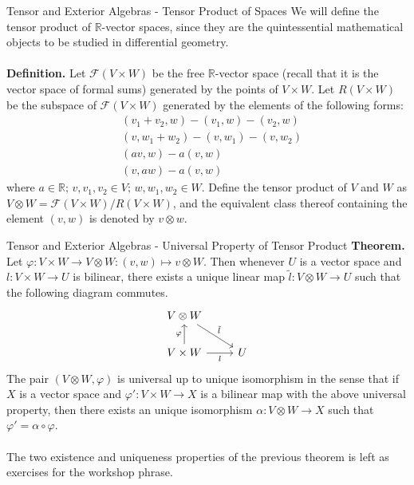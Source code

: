 \documentclass[aspectratio=169]{beamer}
\begin{document}
\begin{frame}{Tensor and Exterior Algebras - Tensor Product of Spaces}
We will define the \alert{tensor product} of $\mathbb{R}$-vector spaces, since they are the quintessential mathematical objects to be studied in differential geometry.
\\~\\
\textbf{Definition.} Let $\mathcal{F}(V\times W)$ be the free $\mathbb{R}$-vector space (recall that it is the vector space of formal sums) generated by the points of $V\times W$. Let $R(V\times W)$ be the subspace of $\mathcal{F}(V\times W)$ generated by the elements of the following forms: \begin{align*}&(v_1+v_2,w)-(v_1,w)-(v_2,w)\\&(v,w_1+w_2)-(v,w_1)-(v,w_2)\\&(av,w)-a(v,w)\\&(v,aw)-a(v,w)\end{align*} where $a\in\mathbb{R};\,v,v_1,v_2\in V;\,w,w_1,w_2\in W$. Define the tensor product of $V$ and $W$ as $V\otimes W=\mathcal{F}(V\times W)/R(V\times W)$, and the equivalent class thereof containing the element $(v,w)$ is denoted by $v\otimes w$.
\end{frame}
\begin{frame}{Tensor and Exterior Algebras - Universal Property of Tensor Product}
\textbf{Theorem.} Let $\varphi:V\times W\to V\otimes W:(v,w)\mapsto v\otimes W$. Then whenever $U$ is a vector space and $l:V\times W\to U$ is bilinear, there exists a unique linear map $\tilde{l}:V\otimes W\to U$ such that the following diagram commutes.
$$
\begin{tikzcd}[ampersand replacement=\&]
V\otimes W \arrow[rd, "\tilde{l}"]               \& {}  \\
V\times W \arrow[u, "\varphi"] \arrow[r, "l"'] \& U
\end{tikzcd}
$$
The pair $(V\otimes W,\varphi)$ is universal up to unique isomorphism in the sense that if $X$ is a vector space and $\varphi':V\times W\to X$ is a bilinear map with the above universal property, then there exists an unique isomorphism $\alpha:V\otimes W\to X$ such that $\varphi'=\alpha\circ\varphi$.
\\~\\
The two existence and uniqueness properties of the previous theorem is left as exercises for the workshop phrase.
\end{frame}
\end{document}
